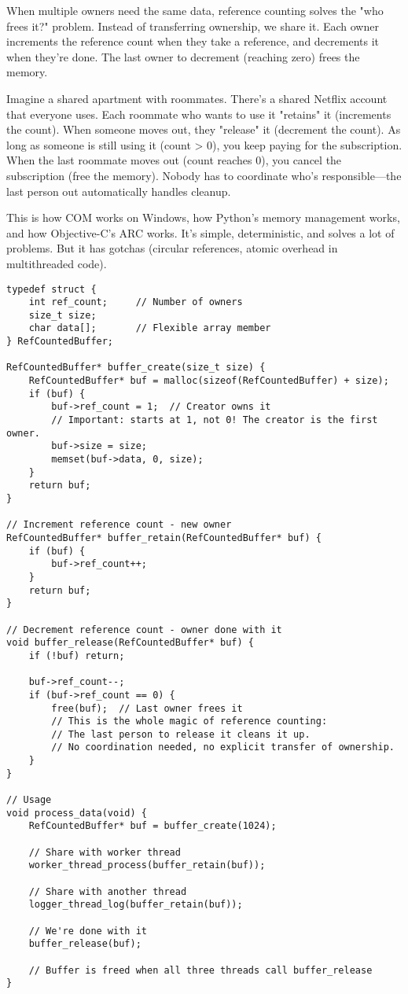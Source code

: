 When multiple owners need the same data, reference counting solves the "who frees it?" problem. Instead of transferring ownership, we share it. Each owner increments the reference count when they take a reference, and decrements it when they're done. The last owner to decrement (reaching zero) frees the memory.

Imagine a shared apartment with roommates. There's a shared Netflix account that everyone uses. Each roommate who wants to use it "retains" it (increments the count). When someone moves out, they "release" it (decrement the count). As long as someone is still using it (count > 0), you keep paying for the subscription. When the last roommate moves out (count reaches 0), you cancel the subscription (free the memory). Nobody has to coordinate who's responsible—the last person out automatically handles cleanup.

This is how COM works on Windows, how Python's memory management works, and how Objective-C's ARC works. It's simple, deterministic, and solves a lot of problems. But it has gotchas (circular references, atomic overhead in multithreaded code).

\begin{lstlisting}
typedef struct {
    int ref_count;     // Number of owners
    size_t size;
    char data[];       // Flexible array member
} RefCountedBuffer;

RefCountedBuffer* buffer_create(size_t size) {
    RefCountedBuffer* buf = malloc(sizeof(RefCountedBuffer) + size);
    if (buf) {
        buf->ref_count = 1;  // Creator owns it
        // Important: starts at 1, not 0! The creator is the first owner.
        buf->size = size;
        memset(buf->data, 0, size);
    }
    return buf;
}

// Increment reference count - new owner
RefCountedBuffer* buffer_retain(RefCountedBuffer* buf) {
    if (buf) {
        buf->ref_count++;
    }
    return buf;
}

// Decrement reference count - owner done with it
void buffer_release(RefCountedBuffer* buf) {
    if (!buf) return;

    buf->ref_count--;
    if (buf->ref_count == 0) {
        free(buf);  // Last owner frees it
        // This is the whole magic of reference counting:
        // The last person to release it cleans it up.
        // No coordination needed, no explicit transfer of ownership.
    }
}

// Usage
void process_data(void) {
    RefCountedBuffer* buf = buffer_create(1024);

    // Share with worker thread
    worker_thread_process(buffer_retain(buf));

    // Share with another thread
    logger_thread_log(buffer_retain(buf));

    // We're done with it
    buffer_release(buf);

    // Buffer is freed when all three threads call buffer_release
}
\end{lstlisting}


